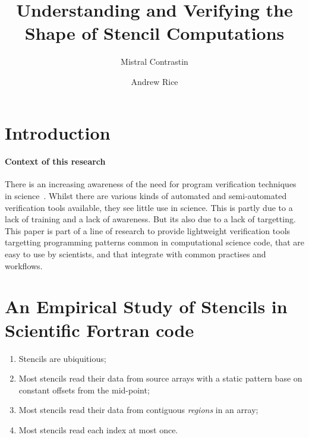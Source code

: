 \documentclass[acmlarge,review,anonymous]{acmart}\settopmatter{printfolios=true}
\begin{document}
\title{Understanding and Verifying the Shape of Stencil Computations}

\author{Mistral Contrastin}

\author{Andrew Rice}

\maketitle

\section{Introduction}

\paragraph{Context of this research}

There is an increasing awareness of the need for program verification
techniques in
science~\cite{post2005computational,oberkampf2010verification,orchard2014computational}.
Whilst there are various kinds of automated and semi-automated
verification tools available, they see little use in science. This is
partly due to a lack of training and a lack of awareness. But its also
due to a lack of targetting. This paper is part of a line of research
to provide lightweight verification tools targetting
programming patterns common in computational science code, 
that are easy to use by scientists, and that integrate with common
practises and workflows.




\section{An Empirical Study of Stencils in Scientific Fortran code}



\begin{enumerate}
\item Stencils are ubiquitious;
\item Most stencils read their data from source arrays with a static pattern
base on constant offsets from the mid-point;
\item Most stencils read their data from contiguous \emph{regions} in an array;
\item Most stencils read each index at most once.
\end{enumerate}
\end{document}
